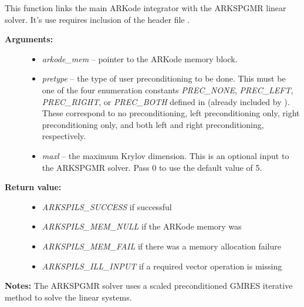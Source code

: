\documentclass[letterpaper,10pt,english]{sphinxmanual}
\begin{document}

\begin{fulllineitems}
\label{c_interface/User_callable:ARKSpgmr}
This function links the main ARKode integrator with the ARKSPGMR
linear solver.  It's use requires inclusion of the header file
.
\begin{description}
\item[{\textbf{Arguments:}}] \leavevmode\begin{itemize}
\item {} 
\emph{arkode\_mem} -- pointer to the ARKode memory block.

\item {} 
\emph{pretype} -- the type of user preconditioning to be done.  This
must be one of the four enumeration constants \emph{PREC\_NONE},
\emph{PREC\_LEFT}, \emph{PREC\_RIGHT}, or \emph{PREC\_BOTH} defined in
 (already included by
). These correspond to no preconditioning,
left preconditioning only, right preconditioning only, and
both left and right preconditioning, respectively.

\item {} 
\emph{maxl} -- the maximum Krylov dimension. This is an optional input
to the ARKSPGMR solver. Pass 0 to use the default value of 5.

\end{itemize}

\item[{\textbf{Return value:}}] \leavevmode\begin{itemize}
\item {} 
\emph{ARKSPILS\_SUCCESS} if successful

\item {} 
\emph{ARKSPILS\_MEM\_NULL}  if the ARKode memory was 

\item {} 
\emph{ARKSPILS\_MEM\_FAIL}  if there was a memory allocation failure

\item {} 
\emph{ARKSPILS\_ILL\_INPUT} if a required vector operation is missing

\end{itemize}

\end{description}

\textbf{Notes:} The ARKSPGMR solver uses a scaled preconditioned GMRES
iterative method to solve the linear systems.

\end{fulllineitems}
\end{document}
